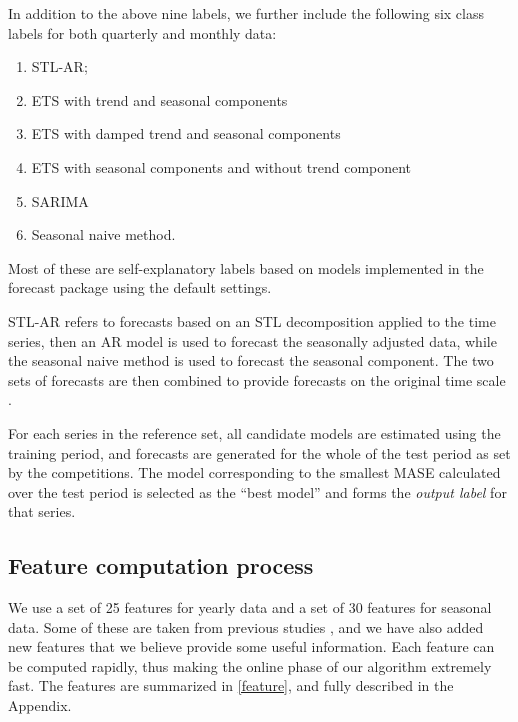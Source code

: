\documentclass[11pt,a4paper,]{article}
\providecommand{\tightlist}{%
  \setlength{\itemsep}{0pt}\setlength{\parskip}{0pt}}
\begin{document}
In addition to the above nine labels, we further include the following six class labels for both quarterly and monthly data:

\begin{enumerate}
\def\labelenumi{(\alph{enumi})}
\setcounter{enumi}{9}
\tightlist
\item
  STL-AR;
\item
  ETS with trend and seasonal components
\item
  ETS with damped trend and seasonal components
\item
  ETS with seasonal components and without trend component
\item
  SARIMA
\item
  Seasonal naive method.
\end{enumerate}

Most of these are self-explanatory labels based on models implemented in the forecast package using the default settings.

STL-AR refers to forecasts based on an STL decomposition applied to the time series, then an AR model is used to forecast the seasonally adjusted data, while the seasonal naive method is used to forecast the seasonal component. The two sets of forecasts are then combined to provide forecasts on the original time scale \autocite{hyndman2014forecasting}.

For each series in the reference set, all candidate models are estimated using the training period, and forecasts are generated for the whole of the test period as set by the competitions. The model corresponding to the smallest MASE \autocite{hyndman2006another} calculated over the test period is selected as the ``best model'' and forms the \emph{output label} for that series.

\hypertarget{sec:features}{%
\subsection{Feature computation process}\label{sec:features}}

We use a set of 25 features for yearly data and a set of 30 features for seasonal data. Some of these are taken from previous studies \autocites{wang2009rule}{hyndman2015large}{kang2017visualising}, and we have also added new features that we believe provide some useful information. Each feature can be computed rapidly, thus making the online phase of our algorithm extremely fast. The features are summarized in \autoref{feature}, and fully described in the Appendix.
\end{document}
